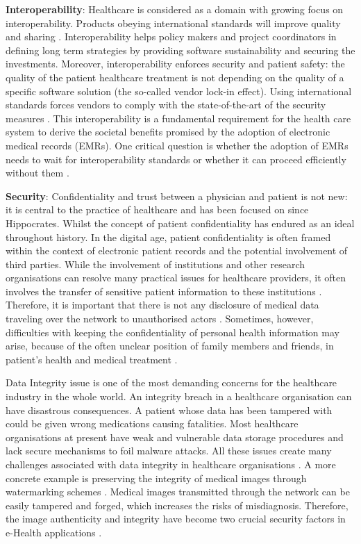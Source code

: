 \textbf{Interoperability}: Healthcare is considered as a domain with growing focus on interoperability. Products obeying international standards will improve quality and sharing . Interoperability helps policy makers and project coordinators in defining long term strategies by providing software sustainability and securing the investments. Moreover, interoperability enforces security and patient safety: the quality of the patient healthcare treatment is not depending on the quality of a specific software solution (the so-called vendor lock-in effect). Using international standards forces vendors to comply with the state-of-the-art of the security measures \cite{health_1}. This interoperability is a fundamental requirement for the health care system to derive the societal benefits promised by the adoption of electronic medical records (EMRs). One critical question is whether the adoption of EMRs needs to wait for interoperability standards or whether it can proceed efficiently without them \cite{health_interop}.\newline

\textbf{Security}: Confidentiality and trust between a physician and patient is not new: it is central to the practice of healthcare and has been focused on since Hippocrates. Whilst the concept of patient confidentiality has endured as an ideal throughout history. In the digital age, patient confidentiality is often framed within the context of electronic patient records and the potential involvement of third parties. While the involvement of institutions and other research organisations can resolve many practical issues for healthcare providers, it often involves the transfer of sensitive patient information to these institutions \cite{health_confidentiality}. Therefore, it is important that there is not any disclosure of medical data traveling over the network to unauthorised actors \cite[p.~96]{req_health2}. Sometimes, however, difficulties with keeping the confidentiality of personal health information may arise, because of the often unclear position of family members and friends, in patient's health and medical treatment \cite{familiy_confidentiality}. 

Data Integrity issue is one of the most demanding concerns for the healthcare industry in the whole world. An integrity breach in a healthcare organisation can have disastrous consequences. A patient whose data has been tampered with could be given wrong medications causing fatalities. Most healthcare organisations at present have weak and vulnerable data storage procedures and lack secure mechanisms to foil malware attacks. All these issues create many challenges associated with data integrity in healthcare organisations \cite{health_integrity1}. A more concrete example is preserving the integrity of medical images through watermarking schemes \cite{watermarking}. Medical images transmitted through the network can be easily tampered and forged, which increases the risks of misdiagnosis. Therefore, the image authenticity and integrity have become two crucial security factors in e-Health applications \cite{health_integrity2}. 


